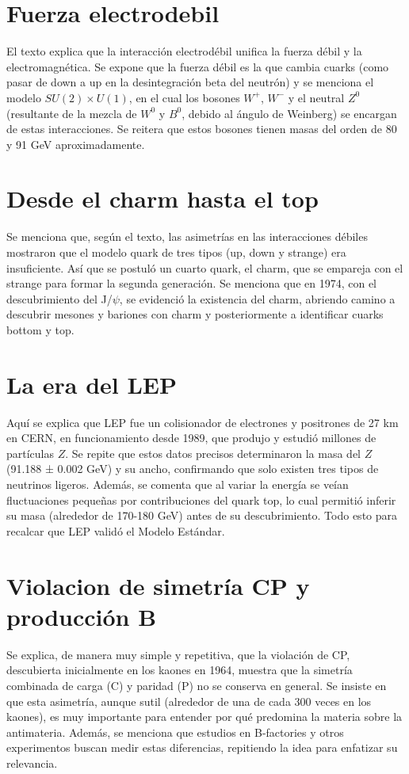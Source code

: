 \documentclass[12pt]{article}
\begin{document}
\section{Fuerza electrodebil}
El texto explica que la interacción electrodébil unifica la fuerza débil y la electromagnética. Se expone que la fuerza débil es la que cambia cuarks (como pasar de down a up en la desintegración beta del neutrón) y se menciona el modelo $SU(2)\times U(1)$, en el cual los bosones $W^{+}$, $W^{-}$ y el neutral $Z^{0}$ (resultante de la mezcla de $W^{0}$ y $B^{0}$, debido al ángulo de Weinberg) se encargan de estas interacciones. Se reitera que estos bosones tienen masas del orden de 80 y 91 GeV aproximadamente.

\section{Desde el charm hasta el top}
Se menciona que, según el texto, las asimetrías en las interacciones débiles mostraron que el modelo quark de tres tipos (up, down y strange) era insuficiente. Así que se postuló un cuarto quark, el charm, que se empareja con el strange para formar la segunda generación. Se menciona que en 1974, con el descubrimiento del J/$\psi$, se evidenció la existencia del charm, abriendo camino a descubrir mesones y bariones con charm y posteriormente a identificar cuarks bottom y top.

\section{La era del LEP}
Aquí se explica que LEP fue un colisionador de electrones y positrones de 27 km en CERN, en funcionamiento desde 1989, que produjo y estudió millones de partículas $Z$. Se repite que estos datos precisos determinaron la masa del $Z$ (91.188 ± 0.002 GeV) y su ancho, confirmando que solo existen tres tipos de neutrinos ligeros. Además, se comenta que al variar la energía se veían fluctuaciones pequeñas por contribuciones del quark top, lo cual permitió inferir su masa (alrededor de 170-180 GeV) antes de su descubrimiento. Todo esto para recalcar que LEP validó el Modelo Estándar.

\section{Violacion de simetría CP y producción B}
Se explica, de manera muy simple y repetitiva, que la violación de CP, descubierta inicialmente en los kaones en 1964, muestra que la simetría combinada de carga (C) y paridad (P) no se conserva en general. Se insiste en que esta asimetría, aunque sutil (alrededor de una de cada 300 veces en los kaones), es muy importante para entender por qué predomina la materia sobre la antimateria. Además, se menciona que estudios en B-factories y otros experimentos buscan medir estas diferencias, repitiendo la idea para enfatizar su relevancia.
\end{document}
